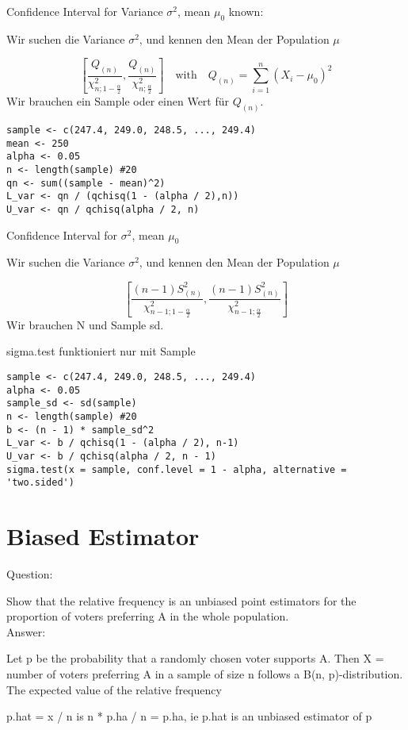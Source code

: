 \begin{multicols*}{2}
\raggedcolumns
\begin{center}
     \Large{Confidence Interval for Variance $\sigma^2$, mean $\mu_0$ known:}
\end{center}
\begin{center}
     \Large{Wir suchen die Variance $\sigma^2$, und kennen den Mean der Population $\mu$}
\end{center}

$$
\left[
\frac{Q_{(n)}}{\chi^2_{n;1-\frac{\alpha}{2}}},
\frac{Q_{(n)}}{\chi^2_{n;\frac{\alpha}{2}}}
\right]
\quad \text{with} \quad  Q_{(n)} = \sum_{i=1}^{n} (X_i - \mu_0)^2
$$
Wir brauchen ein Sample oder einen Wert für $Q_{(n)}$.
\begin{lstlisting}
sample <- c(247.4, 249.0, 248.5, ..., 249.4)
mean <- 250
alpha <- 0.05
n <- length(sample) #20
qn <- sum((sample - mean)^2)
L_var <- qn / (qchisq(1 - (alpha / 2),n))
U_var <- qn / qchisq(alpha / 2, n)
\end{lstlisting}

\columnbreak

\begin{center}
     \Large{Confidence Interval for $\sigma^2$, mean $\mu_0$ \color{red}{UNKNOWN:}}
\end{center}
\begin{center}
     \Large{Wir suchen die Variance $\sigma^2$, und kennen den Mean der Population $\mu$ \color{red}{NICHT}}
\end{center}
$$
\left[
\frac{(n-1)S^2_{(n)}}{\chi^2_{n-1;1-\frac{\alpha}{2}}},
\frac{(n-1)S^2_{(n)}}{\chi^2_{n-1;\frac{\alpha}{2}}}
\right]$$
Wir brauchen N und Sample sd.

\textcolor{red}{\warning} sigma.test funktioniert nur mit Sample \textcolor{red}{\warning}
\begin{lstlisting}
sample <- c(247.4, 249.0, 248.5, ..., 249.4)
alpha <- 0.05
sample_sd <- sd(sample)
n <- length(sample) #20
b <- (n - 1) * sample_sd^2
L_var <- b / qchisq(1 - (alpha / 2), n-1)
U_var <- b / qchisq(alpha / 2, n - 1)
sigma.test(x = sample, conf.level = 1 - alpha, alternative = 'two.sided')
\end{lstlisting}

\section{Biased Estimator}
Question:

Show that the relative frequency is an unbiased point estimators for the proportion of voters preferring A in the whole population.\\

Answer:

Let p be the probability that a randomly chosen voter supports A. Then X =  number of voters
preferring A in a sample of size n follows a B(n, p)-distribution.\\ The expected value of the relative
frequency

p.hat = x / n is n *  p.ha / n = p.ha, ie p.hat is an unbiased estimator of p

\end{multicols*}